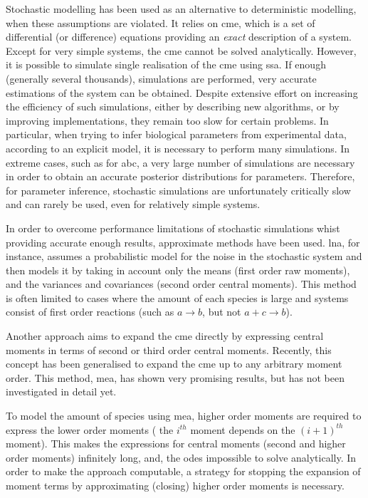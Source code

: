 Stochastic modelling has been used as an alternative to deterministic modelling, when these assumptions are violated.
It relies on \gls{cme}, which is a set of differential (or difference) equations providing an \emph{exact} description of a system\cite{kampen_stochastic_2011}.
Except for very simple systems, the \gls{cme} cannot be solved analytically.
However, it is possible to simulate single realisation of the \gls{cme} using \gls{ssa}.
If enough (generally several thousands), simulations are performed, very accurate estimations of the system can be obtained.
Despite extensive effort on increasing the efficiency of such simulations, either by describing new algorithms, or by improving implementations\cite{niemi_efficient_2011,dittamo_optimized_2009,komarov_accelerating_2012},
they remain too slow for certain problems.
In particular, when trying to infer biological parameters from experimental data, according to an explicit model,
it is necessary to perform many simulations.
In extreme cases, such as for \gls{abc}\cite{toni_approximate_2009}, a very large number of simulations are necessary in order to obtain an 
accurate posterior distributions for parameters.
Therefore, for parameter inference, stochastic simulations are unfortunately critically slow and can rarely be used, even for relatively simple systems.

In order to overcome performance limitations of stochastic simulations whist providing accurate enough results, approximate methods have been used.
\Acrlong{lna}, for instance, 
assumes a probabilistic model for the noise in the stochastic system and then models it by taking in account only the means (first order raw moments), and the variances and covariances (second order central moments)\cite{komorowski_bayesian_2009}.
This method is often limited to cases where the amount of each species is large and systems consist of first order reactions
(such as  $a \rightarrow b$, but not $a + c  \rightarrow b$)\cite{ale_general_2013}.

Another approach aims to expand the \gls{cme} directly by expressing central moments in terms of second or third order central moments\cite{gillespie_moment-closure_2009, gomez-uribe_mass_2007}.
Recently, this concept has been generalised to expand the \gls{cme} up to any arbitrary moment order\cite{ale_general_2013}.
This method, \gls{mea}, has shown very promising results, but has not been investigated in detail yet.

To model the amount of species using \gls{mea}, higher order moments are required to express the lower order moments
(\ie{} the $i^{th}$ moment depends on the $(i+1)^{th}$ moment).
This makes the expressions for central moments (second and higher order moments) infinitely long, and, the \glspl{ode} impossible to solve analytically. 
In order to make the approach computable, a strategy for stopping the
expansion of moment terms by approximating (closing) higher order moments is necessary.

